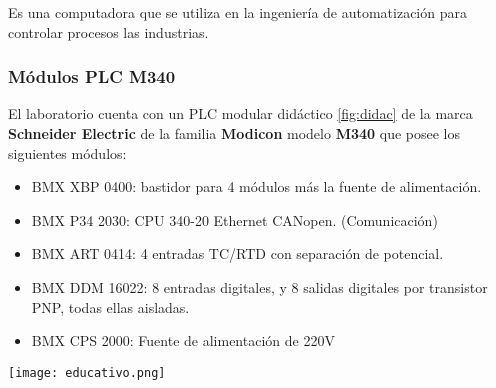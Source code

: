 \begin{tcolorbox}[colback=blue!5!white,colframe=blue!75!black,title=PLC]
	Es una computadora que se utiliza en la ingeniería de automatización para controlar procesos las industrias.
\end{tcolorbox}

\subsubsection{Módulos PLC M340}
El laboratorio cuenta con un PLC modular didáctico \ref{fig:didac} de la marca \textbf{Schneider Electric} de la familia \textbf{Modicon} modelo \textbf{M340} que posee los siguientes módulos:
\begin{itemize}
	\item BMX XBP 0400: bastidor para 4 módulos más la fuente de alimentación.
	\item BMX P34 2030: CPU 340-20 Ethernet CANopen.   (Comunicación)
	\item BMX ART 0414: 4 entradas TC/RTD con separación de potencial.
	\item BMX DDM 16022: 8 entradas digitales, y 8 salidas digitales por transistor PNP, todas ellas aisladas.
	\item BMX CPS 2000: Fuente de alimentación de 220V
\end{itemize}
\begin{center}
	\texttt{[image: educativo.png]}
\label{fig:didac}
\end{center}



